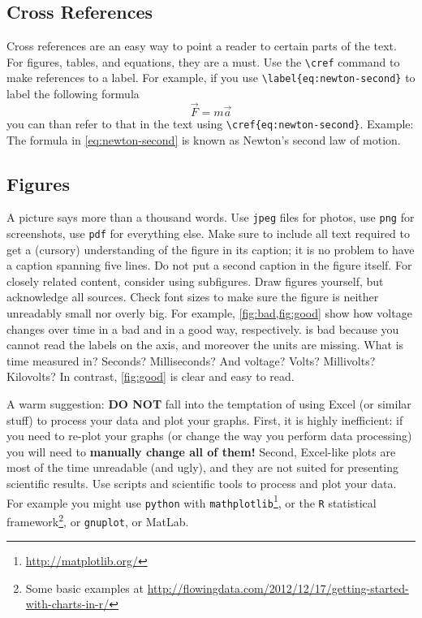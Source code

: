 \documentclass[conference]{IEEEtran}
\begin{document}
\subsection{Cross References}
\label{sec:cross-ref}

Cross references are an easy way to point a reader to certain parts of the text.
For figures, tables, and equations, they are a must.
Use the \verb|\cref| command to make references to a label.
For example, if you use \verb|\label{eq:newton-second}| to label the following formula
\begin{equation}
	\vec{F} = m\vec{a}\label{eq:newton-second}
\end{equation}
you can than refer to that in the text using \verb|\cref{eq:newton-second}|.
Example: The formula in \cref{eq:newton-second} is known as Newton's second law of motion.

\subsection{Figures}

A picture says more than a thousand words.
Use \texttt{jpeg} files for photos, use \texttt{png} for screenshots, use \texttt{pdf} for everything else.
Make sure to include all text required to get a (cursory) understanding of the figure in its caption; it is no problem to have a caption spanning five lines.
Do not put a second caption in the figure itself.
For closely related content, consider using subfigures.
Draw figures yourself, but acknowledge all sources.
Check font sizes to make sure the figure is neither unreadably small nor overly big.
For example, \cref{fig:bad,fig:good} show how voltage changes over time in a bad and in a good way, respectively.
 is bad because you cannot read the labels on the axis, and moreover the units are missing.
What is time measured in? Seconds? Milliseconds? And voltage? Volts? Millivolts? Kilovolts?
In contrast, \cref{fig:good} is clear and easy to read.

A warm suggestion: \textbf{DO NOT} fall into the temptation of using Excel (or similar stuff) to process your data and plot your graphs.
First, it is highly inefficient: if you need to re-plot your graphs (or change the way you perform data processing) you will need to \textbf{manually change all of them!}
Second, Excel-like plots are most of the time unreadable (and ugly), and they are not suited for presenting scientific results.
Use scripts and scientific tools to process and plot your data.
For example you might use \texttt{python} with \texttt{mathplotlib}\footnote{\url{http://matplotlib.org/}}, or the \texttt{R} statistical framework\footnote{Some basic examples at \url{http://flowingdata.com/2012/12/17/getting-started-with-charts-in-r/}}, or \texttt{gnuplot}, or MatLab.
\end{document}
